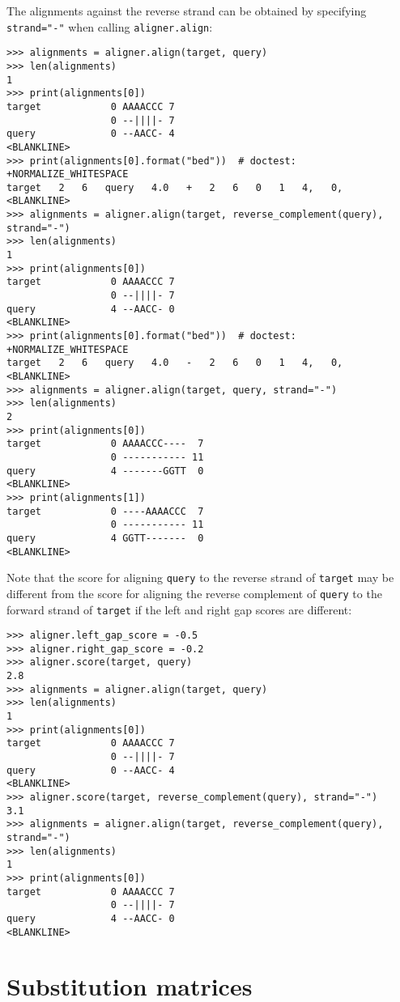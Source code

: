 The alignments against the reverse strand can be obtained by specifying \verb+strand="-"+ when calling \verb+aligner.align+:
\begin{verbatim}
>>> alignments = aligner.align(target, query)
>>> len(alignments)
1
>>> print(alignments[0])
target            0 AAAACCC 7
                  0 --||||- 7
query             0 --AACC- 4
<BLANKLINE>
>>> print(alignments[0].format("bed"))  # doctest: +NORMALIZE_WHITESPACE
target   2   6   query   4.0   +   2   6   0   1   4,   0,
<BLANKLINE>
>>> alignments = aligner.align(target, reverse_complement(query), strand="-")
>>> len(alignments)
1
>>> print(alignments[0])
target            0 AAAACCC 7
                  0 --||||- 7
query             4 --AACC- 0
<BLANKLINE>
>>> print(alignments[0].format("bed"))  # doctest: +NORMALIZE_WHITESPACE
target   2   6   query   4.0   -   2   6   0   1   4,   0,
<BLANKLINE>
>>> alignments = aligner.align(target, query, strand="-")
>>> len(alignments)
2
>>> print(alignments[0])
target            0 AAAACCC----  7
                  0 ----------- 11
query             4 -------GGTT  0
<BLANKLINE>
>>> print(alignments[1])
target            0 ----AAAACCC  7
                  0 ----------- 11
query             4 GGTT-------  0
<BLANKLINE>
\end{verbatim}

Note that the score for aligning \verb+query+ to the reverse strand of \verb+target+ may be different from the score for aligning the reverse complement of \verb+query+ to the forward strand of \verb+target+ if the left and right gap scores are different:
\begin{verbatim}
>>> aligner.left_gap_score = -0.5
>>> aligner.right_gap_score = -0.2
>>> aligner.score(target, query)
2.8
>>> alignments = aligner.align(target, query)
>>> len(alignments)
1
>>> print(alignments[0])
target            0 AAAACCC 7
                  0 --||||- 7
query             0 --AACC- 4
<BLANKLINE>
>>> aligner.score(target, reverse_complement(query), strand="-")
3.1
>>> alignments = aligner.align(target, reverse_complement(query), strand="-")
>>> len(alignments)
1
>>> print(alignments[0])
target            0 AAAACCC 7
                  0 --||||- 7
query             4 --AACC- 0
<BLANKLINE>
\end{verbatim}


\section{Substitution matrices}
\label{sec:substitution_matrices}

